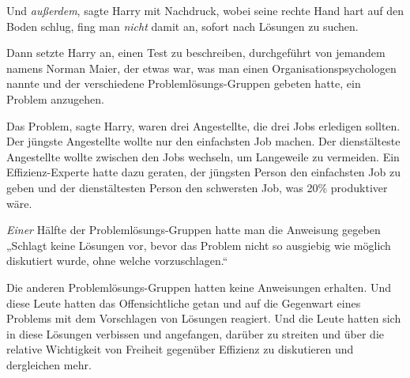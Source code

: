 Und \emph{außerdem}, sagte Harry mit Nachdruck, wobei seine rechte Hand hart auf den Boden schlug, fing man \emph{nicht} damit an, sofort nach Lösungen zu suchen.

Dann setzte Harry an, einen Test zu beschreiben, durchgeführt von jemandem namens Norman Maier, der etwas war, was man einen Organisationspsychologen nannte und der verschiedene Problemlösungs-Gruppen gebeten hatte, ein Problem anzugehen.

Das Problem, sagte Harry, waren drei Angestellte, die drei Jobs erledigen sollten. Der jüngste Angestellte wollte nur den einfachsten Job machen. Der dienstälteste Angestellte wollte zwischen den Jobs wechseln, um Langeweile zu vermeiden. Ein Effizienz-Experte hatte dazu geraten, der jüngsten Person den einfachsten Job zu geben und der dienstältesten Person den schwersten Job, was 20\% produktiver wäre.

\emph{Einer} Hälfte der Problemlösungs-Gruppen hatte man die Anweisung gegeben
„Schlagt keine Lösungen vor, bevor das Problem nicht so ausgiebig wie möglich diskutiert wurde, ohne welche vorzuschlagen.“

Die anderen Problemlösungs-Gruppen hatten keine Anweisungen erhalten. Und diese Leute hatten das Offensichtliche getan und auf die Gegenwart eines Problems mit dem Vorschlagen von Lösungen reagiert. Und die Leute hatten sich in diese Lösungen verbissen und angefangen, darüber zu streiten und über die relative Wichtigkeit von Freiheit gegenüber Effizienz zu diskutieren und dergleichen mehr.

